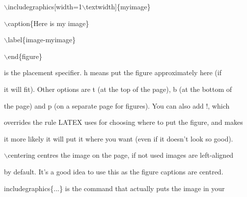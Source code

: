 \documentclass[a4paper,portrait,12pt]{article}
\begin{document}
\begin{flushleft}
\ensuremath{\backslash}includegraphics[width=1\ensuremath{\backslash}textwidth]\{myimage\}
\end{flushleft}


\begin{flushleft}
\ensuremath{\backslash}caption\{Here is my image\}
\end{flushleft}


\begin{flushleft}
\ensuremath{\backslash}label\{image-myimage\}
\end{flushleft}


\begin{flushleft}
\ensuremath{\backslash}end\{figure\}
\end{flushleft}





\begin{flushleft}
[h] is the placement specifier. h means put the figure approximately here (if
\end{flushleft}


\begin{flushleft}
it will fit). Other options are t (at the top of the page), b (at the bottom of
\end{flushleft}


\begin{flushleft}
the page) and p (on a separate page for figures). You can also add !, which
\end{flushleft}


\begin{flushleft}
overrides the rule LATEX uses for choosing where to put the figure, and makes
\end{flushleft}


\begin{flushleft}
it more likely it will put it where you want (even if it doesn't look so good).
\end{flushleft}


\begin{flushleft}
\ensuremath{\backslash}centering centres the image on the page, if not used images are left-aligned
\end{flushleft}


\begin{flushleft}
by default. It's a good idea to use this as the figure captions are centred.
\end{flushleft}


\begin{flushleft}
includegraphics\{...\} is the command that actually puts the image in your
\end{flushleft}
\end{document}
